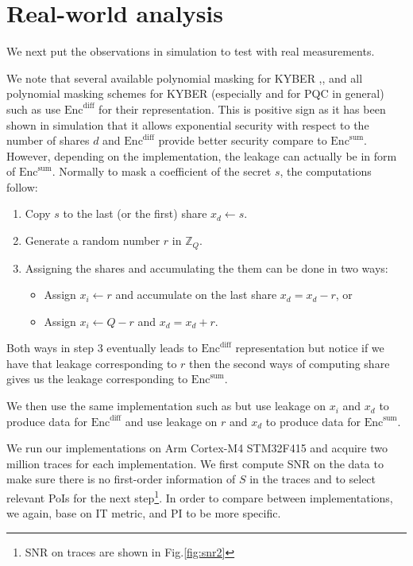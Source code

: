 \documentclass{llncs}
\begin{document}
\section{Real-world analysis}\label{sec:onm}
We next put the observations in simulation to test with real measurements.

We note that several available polynomial masking for KYBER \cite{Kmaskimp0},\cite{Kmaskimp1}, \cite{Kmaskimp2} and all polynomial masking schemes for KYBER (especially and for PQC in general) such as \cite{Kmask1}  use $\text{Enc}^{\text{diff}}$ for their representation. This is positive sign as it has been shown in simulation that it allows exponential security with respect to the number of shares $d$ and $\text{Enc}^{\text{diff}}$ provide better security compare to $\text{Enc}^{\text{sum}}$. However, depending on the implementation, the leakage can actually be in form of $\text{Enc}^{\text{sum}}$. Normally to mask a coefficient of the secret $s$, the computations follow:
\begin{enumerate}
	\item Copy $s$ to the last (or the first) share $x_d \leftarrow s$.
	\item Generate a random number $r$ in $\mathbb{Z}_Q$.
	\item Assigning the shares and accumulating the them can be done in two ways:
	\begin{itemize}
		\item Assign $x_i \leftarrow r$ and accumulate on the last share $x_d = x_d - r$, or
		\item Assign $x_i \leftarrow Q - r$ and $x_d = x_d + r$.
	\end{itemize}
\end{enumerate}
Both ways in step 3 eventually leads to $\text{Enc}^{\text{diff}}$ representation but notice if we have that leakage corresponding to $r$ then the second ways of computing share gives us the leakage corresponding to $\text{Enc}^{\text{sum}}$.

We then use the same implementation such as \cite{Kmaskimp0} but use leakage on $x_i$ and $x_d$ to produce data for $\text{Enc}^{\text{diff}}$ and use leakage on $r$ and $x_d$ to produce data for $\text{Enc}^{\text{sum}}$.

We run our implementations on Arm Cortex-M4 STM32F415 and acquire two million traces for each implementation. We first compute SNR on the data to make sure there is no first-order information of $S$ in the traces and to select relevant PoIs for the next step\footnote{SNR on traces are shown in Fig.\ref{fig:snr2}}. In order to compare between implementations, we again, base on IT metric, and PI to be more specific.
\end{document}
